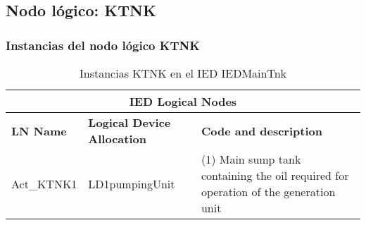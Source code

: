
\subsection{Nodo l\'ogico: 			 KTNK}

    \subsubsection{Instancias del nodo l\'ogico KTNK}
    \begin{table}[H]
    \begin{center}
    \begin{tabular}{|l|l|p{6.8cm}|}
            \hline
            \multicolumn{3}{|c|}{\cellcolor[gray]{0.8} \textbf{IED Logical Nodes} } \\
            \hline
            \textbf{LN Name} & \textbf{Logical Device Allocation} & \textbf{Code and description} \\
            \hline
            Act\_KTNK1 & LD1pumpingUnit & (1) Main sump tank containing the oil required for operation of the generation unit \\
            \hline
    \end{tabular}
    \caption{Instancias KTNK en el IED IEDMainTnk}
    \label{table:lnInstKTNK_1}
    \end{center}
    \end{table}
    
    
    
